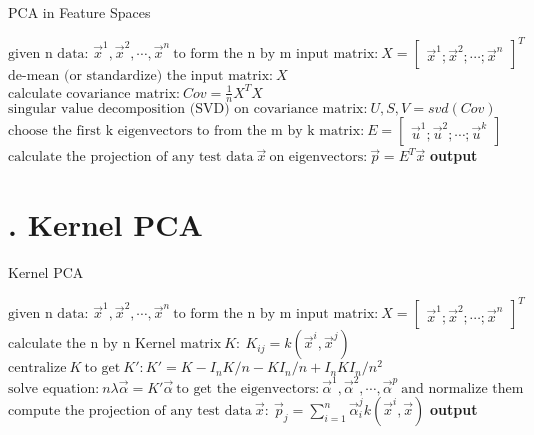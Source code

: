 \begin{algorithm}
\caption{PCA in Feature Spaces}
\label{PCA}
\begin{algorithmic}[1]
	\State $\text{given n data: } \vec{x}^1, \vec{x}^2, \cdots, \vec{x}^n \  \text{to form the n by m input matrix:} \  X = \begin{bmatrix} \vec{x}^1; \vec{x}^2; \cdots; \vec{x}^n \end{bmatrix}^T$
	\State $\text{de-mean (or standardize) the input matrix:} \  X$
	\State $\text{calculate covariance matrix:} \  Cov = \frac{1}{n} X^T X$
	\State $\text{singular value decomposition (SVD) on covariance matrix:} \  U, S, V = svd(Cov)$
	\State $\text{choose the first k eigenvectors to from the m by k matrix:} \  E = \begin{bmatrix} \vec{u}^1; \vec{u}^2; \cdots; \vec{u}^k \end{bmatrix}$
	\State $\text{calculate the projection of any test data} \  \vec{x} \  \text{on eigenvectors:} \  \vec{p} = E^T \vec{x}$
\BState \bf output
\EndProcedure
\end{algorithmic}
\end{algorithm}

\section*{\Large {}. Kernel PCA}

\begin{algorithm}
\caption{Kernel PCA}
\label{PCA}
\begin{algorithmic}[1]
	\State $\text{given n data: } \vec{x}^1, \vec{x}^2, \cdots, \vec{x}^n \  \text{to form the n by m input matrix:} \  X = \begin{bmatrix} \vec{x}^1; \vec{x}^2; \cdots; \vec{x}^n \end{bmatrix}^T$
	\State $\text{calculate the n by n Kernel matrix} \  K: \  K_{ij} = k(\vec{x}^i, \vec{x}^j)$
	\State $\text{centralize} \  K \  \text{to get} \  K':  K' = K - I_nK/n - KI_n/n + I_nKI_n/n^2$
	\State $\text{solve equation:} \  n \lambda \vec{\alpha} = K' \vec{\alpha} \  \text{to get the eigenvectors:} \  \vec{\alpha}^1, \vec{\alpha}^2, \cdots, \vec{\alpha}^p \  \text{and normalize them}$
	\State $\text{compute the projection of any test data} \  \vec{x}:  \  \vec{p}_j = \sum_{i=1}^n \vec{\alpha}_i^j k(\vec{x}^i, \vec{x})$
\BState \bf output
\EndProcedure
\end{algorithmic}
\end{algorithm}

\newpage


\clearpage

%
%
%




